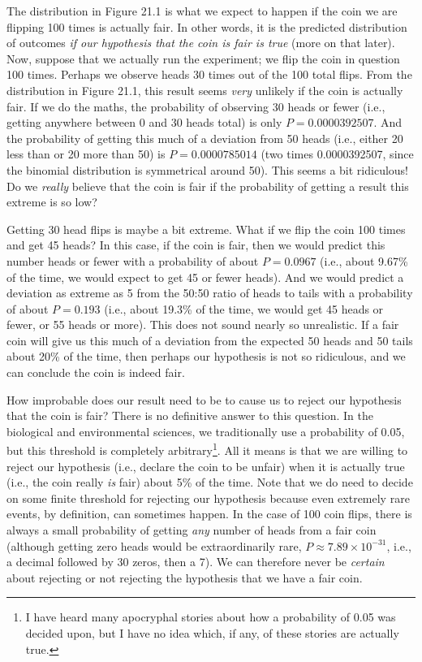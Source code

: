 \documentclass[
  openany]{krantz}
\begin{document}
The distribution in Figure 21.1 is what we expect to happen if the coin we are flipping 100 times is actually fair.
In other words, it is the predicted distribution of outcomes \emph{if our hypothesis that the coin is fair is true} (more on that later).
Now, suppose that we actually run the experiment; we flip the coin in question 100 times.
Perhaps we observe heads 30 times out of the 100 total flips.
From the distribution in Figure 21.1, this result seems \emph{very} unlikely if the coin is actually fair.
If we do the maths, the probability of observing 30 heads or fewer (i.e., getting anywhere between 0 and 30 heads total) is only \(P = 0.0000392507\).
And the probability of getting this much of a deviation from 50 heads (i.e., either 20 less than or 20 more than 50) is \(P = 0.0000785014\) (two times 0.0000392507, since the binomial distribution is symmetrical around 50).
This seems a bit ridiculous!
Do we \emph{really} believe that the coin is fair if the probability of getting a result this extreme is so low?

Getting 30 head flips is maybe a bit extreme.
What if we flip the coin 100 times and get 45 heads?
In this case, if the coin is fair, then we would predict this number heads or fewer with a probability of about \(P = 0.0967\) (i.e., about 9.67\% of the time, we would expect to get 45 or fewer heads).
And we would predict a deviation as extreme as 5 from the 50:50 ratio of heads to tails with a probability of about \(P = 0.193\) (i.e., about 19.3\% of the time, we would get 45 heads or fewer, or 55 heads or more).
This does not sound nearly so unrealistic.
If a fair coin will give us this much of a deviation from the expected 50 heads and 50 tails about 20\% of the time, then perhaps our hypothesis is not so ridiculous, and we can conclude the coin is indeed fair.

How improbable does our result need to be to cause us to reject our hypothesis that the coin is fair?
There is no definitive answer to this question.
In the biological and environmental sciences, we traditionally use a probability of 0.05, but this threshold is completely arbitrary\footnote{I have heard many apocryphal stories about how a probability of 0.05 was decided upon, but I have no idea which, if any, of these stories are actually true.}.
All it means is that we are willing to reject our hypothesis (i.e., declare the coin to be unfair) when it is actually true (i.e., the coin really \emph{is} fair) about 5\% of the time.
Note that we do need to decide on some finite threshold for rejecting our hypothesis because even extremely rare events, by definition, can sometimes happen.
In the case of 100 coin flips, there is always a small probability of getting \emph{any} number of heads from a fair coin (although getting zero heads would be extraordinarily rare, \(P \approx 7.89 \times 10^{-31}\), i.e., a decimal followed by 30 zeros, then a 7).
We can therefore never be \emph{certain} about rejecting or not rejecting the hypothesis that we have a fair coin.
\end{document}
